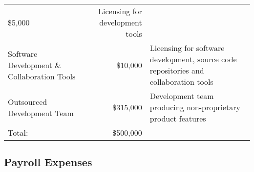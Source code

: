 \documentclass[10pt,openany]{book}
\begin{document}
\begin{longtable}[]{@{}lrl@{}}
\begin{minipage}[t]{0.11\columnwidth}
\$5,000\strut
\end{minipage} & \begin{minipage}[t]{0.39\columnwidth}\raggedright
Licensing for development tools\strut
\end{minipage}\tabularnewline
\begin{minipage}[t]{0.41\columnwidth}\raggedright
Software Development \& Collaboration Tools\strut
\end{minipage} & \begin{minipage}[t]{0.11\columnwidth}\raggedleft
\$10,000\strut
\end{minipage} & \begin{minipage}[t]{0.39\columnwidth}\raggedright
Licensing for software development, source code repositories and
collaboration tools\strut
\end{minipage}\tabularnewline
\begin{minipage}[t]{0.41\columnwidth}\raggedright
Outsourced Development Team\strut
\end{minipage} & \begin{minipage}[t]{0.11\columnwidth}\raggedleft
\$315,000\strut
\end{minipage} & \begin{minipage}[t]{0.39\columnwidth}\raggedright
Development team producing non-proprietary product features\strut
\end{minipage}\tabularnewline
\begin{minipage}[t]{0.41\columnwidth}\raggedright
Total:\strut
\end{minipage} & \begin{minipage}[t]{0.11\columnwidth}\raggedleft
\$500,000\strut
\end{minipage} & \begin{minipage}[t]{0.39\columnwidth}\raggedright
\strut
\end{minipage}\tabularnewline
\bottomrule
\end{longtable}

\hypertarget{payroll-expenses}{%
\subsection{Payroll Expenses}\label{payroll-expenses}}
\end{document}
